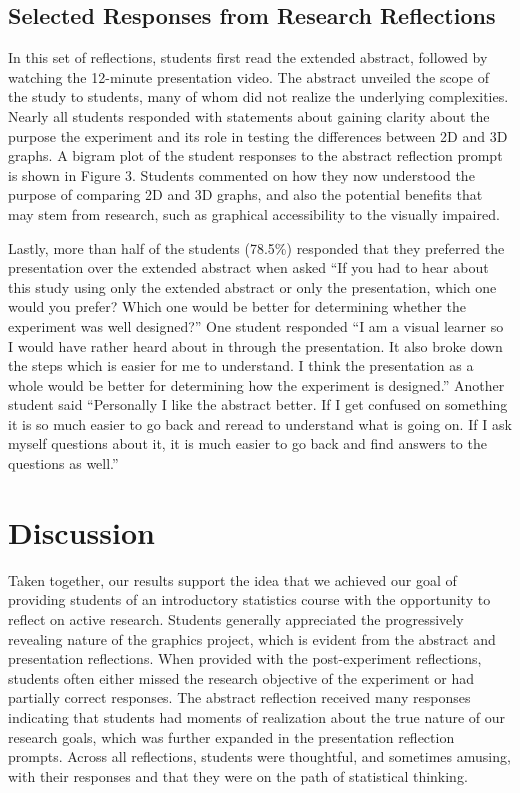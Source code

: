 \documentclass[
  12pt,
]{article}
\begin{document}
\subsection{Selected Responses from Research
Reflections}\label{selected-responses-from-research-reflections}

In this set of reflections, students first read the extended abstract,
followed by watching the 12-minute presentation video. The abstract
unveiled the scope of the study to students, many of whom did not
realize the underlying complexities. Nearly all students responded with
statements about gaining clarity about the purpose the experiment and
its role in testing the differences between 2D and 3D graphs. A bigram
plot of the student responses to the abstract reflection prompt is shown
in Figure 3. Students commented on how they now understood the purpose
of comparing 2D and 3D graphs, and also the potential benefits that may
stem from research, such as graphical accessibility to the visually
impaired.

Lastly, more than half of the students (78.5\%) responded that they
preferred the presentation over the extended abstract when asked ``If
you had to hear about this study using only the extended abstract or
only the presentation, which one would you prefer? Which one would be
better for determining whether the experiment was well designed?'' One
student responded ``I am a visual learner so I would have rather heard
about in through the presentation. It also broke down the steps which is
easier for me to understand. I think the presentation as a whole would
be better for determining how the experiment is designed.'' Another
student said ``Personally I like the abstract better. If I get confused
on something it is so much easier to go back and reread to understand
what is going on. If I ask myself questions about it, it is much easier
to go back and find answers to the questions as well.''

\section{Discussion}\label{discussion}

Taken together, our results support the idea that we achieved our goal
of providing students of an introductory statistics course with the
opportunity to reflect on active research. Students generally
appreciated the progressively revealing nature of the graphics project,
which is evident from the abstract and presentation reflections. When
provided with the post-experiment reflections, students often either
missed the research objective of the experiment or had partially correct
responses. The abstract reflection received many responses indicating
that students had moments of realization about the true nature of our
research goals, which was further expanded in the presentation
reflection prompts. Across all reflections, students were thoughtful,
and sometimes amusing, with their responses and that they were on the
path of statistical thinking.
\end{document}
